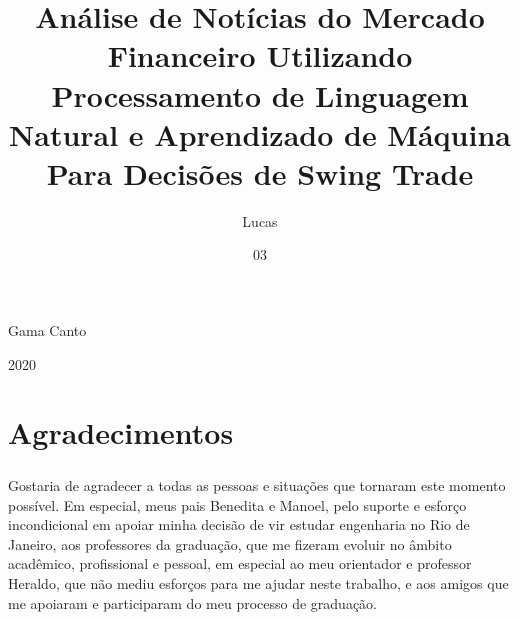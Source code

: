 \documentclass[grad,numbers]{coppe}
\begin{document}
  \title{Análise de Notícias do Mercado Financeiro Utilizando Processamento de Linguagem Natural e Aprendizado de Máquina Para Decisões de Swing Trade}
  \author{Lucas}{Gama Canto}

  
  
  \date{03}{2020}


  \maketitle

  \frontmatter
  
  \makecatalog
  
  \dedication{Ao povo brasileiro, pela total contribuição em minha graduação.}

  \chapter*{Agradecimentos}

	  \paragraph{}Gostaria de agradecer a todas as pessoas e situações que tornaram este momento possível. Em especial, meus pais Benedita e Manoel, pelo suporte e esforço incondicional em apoiar minha decisão de vir estudar engenharia no Rio de Janeiro, aos professores da graduação, que me fizeram evoluir no âmbito acadêmico, profissional e pessoal, em especial ao meu orientador e professor Heraldo, que não mediu esforços para me ajudar neste trabalho, e aos amigos que me apoiaram e participaram do meu processo de graduação.
\end{document}
